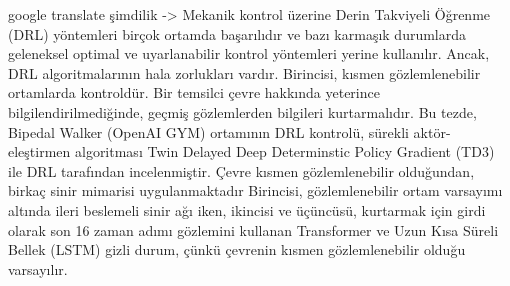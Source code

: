 google translate şimdilik -> Mekanik kontrol üzerine Derin Takviyeli Öğrenme (DRL) yöntemleri birçok ortamda başarılıdır ve bazı karmaşık durumlarda geleneksel optimal ve uyarlanabilir kontrol yöntemleri yerine kullanılır. Ancak, DRL algoritmalarının hala zorlukları vardır. Birincisi, kısmen gözlemlenebilir ortamlarda kontroldür. Bir temsilci çevre hakkında yeterince bilgilendirilmediğinde, geçmiş gözlemlerden bilgileri kurtarmalıdır. Bu tezde, Bipedal Walker (OpenAI GYM) ortamının DRL kontrolü, sürekli aktör-eleştirmen algoritması Twin Delayed Deep Determinstic Policy Gradient (TD3) ile DRL tarafından incelenmiştir. Çevre kısmen gözlemlenebilir olduğundan, birkaç sinir mimarisi uygulanmaktadır Birincisi, gözlemlenebilir ortam varsayımı altında ileri beslemeli sinir ağı iken, ikincisi ve üçüncüsü, kurtarmak için girdi olarak son 16 zaman adımı gözlemini kullanan Transformer ve Uzun Kısa Süreli Bellek (LSTM) gizli durum, çünkü çevrenin kısmen gözlemlenebilir olduğu varsayılır.